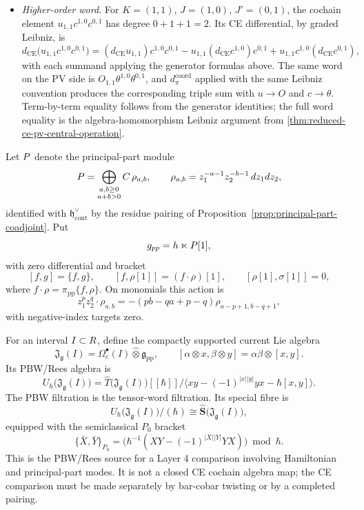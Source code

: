 \documentclass[11pt]{memoir}
\begin{document}
\begin{ex}
\begin{itemize}
    \item \emph{Higher-order word.} For $K=(1,1)$, $J=(1,0)$,
      $J'=(0,1)$, the cochain element $u_{1,1}c^{1,0}c^{0,1}$ has
      degree $0+1+1=2$. Its CE differential, by graded Leibniz, is
      $$d_{\mathrm{CE}}\bigl(u_{1,1}c^{1,0}c^{0,1}\bigr)
        =(d_{\mathrm{CE}}u_{1,1})c^{1,0}c^{0,1}
        -u_{1,1}(d_{\mathrm{CE}}c^{1,0})c^{0,1}
        +u_{1,1}c^{1,0}(d_{\mathrm{CE}}c^{0,1}),$$
      with each summand applying the generator formulas above. The
      same word on the PV side is $O_{1,1}\theta^{1,0}\theta^{0,1}$,
	      and \(d_\pi^{\mathrm{coord}}\) applied with the same Leibniz convention produces
      the corresponding triple sum with $u\to O$ and $c\to\theta$.
      Term-by-term equality follows from the generator identities; the
      full word equality is the algebra-homomorphism Leibniz argument
      from \ref{thm:reduced-ce-pv-central-operation}.
  \end{itemize}
\end{ex}

\begin{constr}\label{constr:compact-current-pbw-rees-source}
  Let $P$ denote the principal-part module
  $$P=\bigoplus_{\substack{a,b\geq0\\ a+b>0}}C\,\rho_{a,b},\qquad
    \rho_{a,b}=z_1^{-a-1}z_2^{-b-1}\,dz_1dz_2,$$
  identified with $\mathfrak h^\vee_{\mathrm{cont}}$ by the residue pairing
  of Proposition~\ref{prop:principal-part-coadjoint}. Put
  $$g_{pp}=h\ltimes P[1],$$
  with zero differential and bracket
  $$[f,g]=\{f,g\},\qquad [f,\rho[1]]=(f\cdot\rho)[1],\qquad
    [\rho[1],\sigma[1]]=0,$$
  where $f\cdot\rho=\pi_{\mathrm{pp}}\{f,\rho\}$. On monomials this action is
  $$z_1^pz_2^q\cdot\rho_{a,b}
    =-(pb-qa+p-q)\rho_{a-p+1,b-q+1},$$
  with negative-index targets zero.

  For an interval $I\subset R$, define the compactly supported current Lie
  algebra
  $$\mathfrak J_{\mathfrak g}(I)
    =\Omega_c^\bullet(I)\widehat\otimes\mathfrak g_{\mathrm{pp}},\qquad
    [\alpha\otimes x,\beta\otimes y]
      =\alpha\beta\otimes[x,y].$$
  Its PBW/Rees algebra is
  $$U_\hbar\bigl(\mathfrak J_{\mathfrak g}(I)\bigr)
    =\widehat T\bigl(\mathfrak J_{\mathfrak g}(I)\bigr)[[\hbar]]
      \big/
      \langle xy-(-1)^{|x||y|}yx-\hbar[x,y]\rangle.$$
  The PBW filtration is the tensor-word filtration. Its special fibre is
  $$U_\hbar\bigl(\mathfrak J_{\mathfrak g}(I)\bigr)/(\hbar)
    \cong \widehat{\mathbf S}\bigl(\mathfrak J_{\mathfrak g}(I)\bigr),$$
  equipped with the semiclassical $P_0$ bracket
  $$\{\bar X,\bar Y\}_{P_0}
    =\bigl(\hbar^{-1}(XY-(-1)^{|X||Y|}YX)\bigr)\bmod\hbar.$$
  This is the PBW/Rees source for a Layer 4 comparison involving
  Hamiltonian and principal-part modes.
  It is not a closed CE cochain algebra map; the CE comparison must be made
  separately by bar-cobar twisting or by a completed pairing.
\end{constr}
\end{document}
